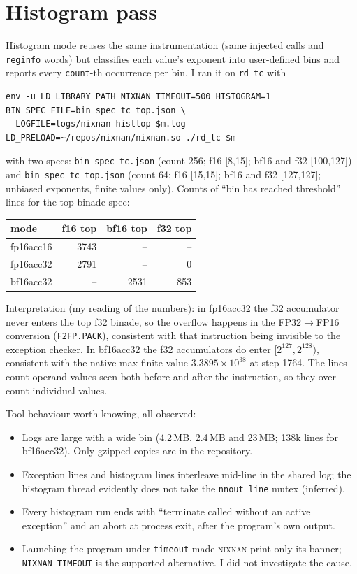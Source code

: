 \documentclass[11pt]{article}
\newcommand{\nn}{\textsc{nixnan}}
\begin{document}
\section{Histogram pass}\label{sec:histo}
Histogram mode reuses the same instrumentation (same injected calls and \texttt{reginfo} words) but classifies each value's exponent into user-defined bins and reports every \texttt{count}-th occurrence per bin. I ran it on \texttt{rd\_tc} with
\begin{lstlisting}
env -u LD_LIBRARY_PATH NIXNAN_TIMEOUT=500 HISTOGRAM=1 BIN_SPEC_FILE=bin_spec_tc_top.json \
  LOGFILE=logs/nixnan-histtop-$m.log LD_PRELOAD=~/repos/nixnan/nixnan.so ./rd_tc $m
\end{lstlisting}
with two specs: \texttt{bin\_spec\_tc.json} (count 256; f16 [8,15]; bf16 and f32 [100,127]) and \texttt{bin\_spec\_tc\_top.json} (count 64; f16 [15,15]; bf16 and f32 [127,127]; unbiased exponents, finite values only). Counts of ``bin has reached threshold'' lines for the top-binade spec:
\begin{center}\begin{tabular}{lrrr}\toprule mode & f16 top & bf16 top & f32 top\\\midrule
fp16acc16 & 3743 & -- & --\\ fp16acc32 & 2791 & -- & 0\\ bf16acc32 & -- & 2531 & 853\\\bottomrule\end{tabular}\end{center}
Interpretation (my reading of the numbers): in fp16acc32 the f32 accumulator never enters the top f32 binade, so the overflow happens in the FP32$\to$FP16 conversion (\texttt{F2FP.PACK}), consistent with that instruction being invisible to the exception checker. In bf16acc32 the f32 accumulators do enter $[2^{127},2^{128})$, consistent with the native max finite value $3.3895\times10^{38}$ at step 1764. The lines count operand values seen both before and after the instruction, so they over-count individual values.

Tool behaviour worth knowing, all observed:
\begin{itemize}
\item Logs are large with a wide bin (4.2\,MB, 2.4\,MB and 23\,MB; 138k lines for bf16acc32). Only gzipped copies are in the repository.
\item Exception lines and histogram lines interleave mid-line in the shared log; the histogram thread evidently does not take the \texttt{nnout\_line} mutex (inferred).
\item Every histogram run ends with ``terminate called without an active exception'' and an abort at process exit, after the program's own output.
\item Launching the program under \texttt{timeout} made \nn{} print only its banner; \texttt{NIXNAN\_TIMEOUT} is the supported alternative. I did not investigate the cause.
\end{itemize}
\end{document}
